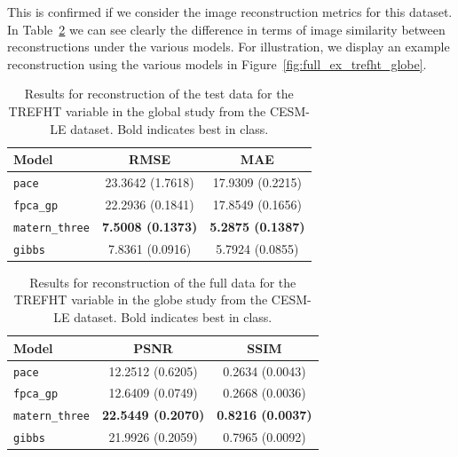 This is confirmed if we consider the image reconstruction metrics for this dataset.
In Table~\ref{tab:full_cesm_trefht_globe} we can see clearly the difference in terms of image similarity between reconstructions under the various models. 
For illustration, we display an example reconstruction using the various models in Figure~\ref{fig:full_ex_trefht_globe}.

\begin{table}
	\caption[Results for the TREFHT variable on test data in the Global study.]{Results for reconstruction of the test data for the TREFHT variable in the global study from the CESM-LE dataset. Bold indicates best in class.}
	\centering
	\label{tab:test_cesm_trefht_globe}
	\begin{tabular}{lcc}
		\toprule
		\textbf{Model} & \textbf{RMSE} & \textbf{MAE} \\
		\midrule
		\verb*|pace| & 23.3642	(1.7618) & 17.9309 (0.2215) \\
		\verb*|fpca_gp| & 22.2936	(0.1841) & 17.8549 (0.1656) \\
		\verb*|matern_three| & \textbf{7.5008 (0.1373)}& \textbf{5.2875 (0.1387)}\\
		\verb*|gibbs| & 7.8361 (0.0916) & 5.7924 (0.0855)\\
		\bottomrule
	\end{tabular}
\end{table}

\begin{table}
	\caption[Results for the TREFHT variable on full data in the Global study.]{Results for reconstruction of the full data for the TREFHT variable in the globe study from the CESM-LE dataset. Bold indicates best in class.}
	\centering
	\label{tab:full_cesm_trefht_globe}
	\begin{tabular}{lcc}
		\toprule
		\textbf{Model} & \textbf{PSNR} & \textbf{SSIM} \\
		\midrule
		\verb*|pace| & 12.2512 (0.6205) & 0.2634	(0.0043) \\
		\verb*|fpca_gp| & 12.6409 (0.0749) & 0.2668 (0.0036) \\
		\verb*|matern_three| & \textbf{22.5449	(0.2070)} & \textbf{0.8216 (0.0037)}\\
		\verb*|gibbs| & 21.9926 (0.2059) & 0.7965	(0.0092)\\
		\bottomrule
	\end{tabular}
\end{table}

